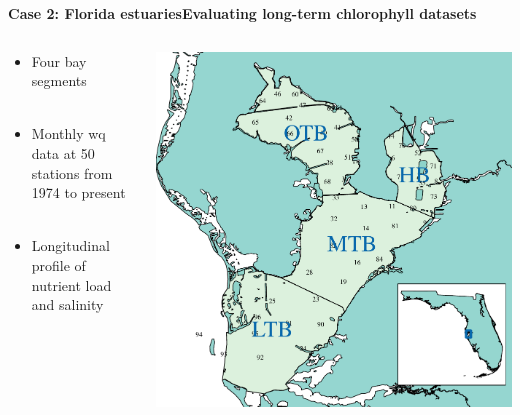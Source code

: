 \documentclass[serif]{beamer}\usepackage[]{graphicx}\usepackage[]{color}
\begin{document}
\begin{frame}{\textbf{Case 2: Florida estuaries}}{\textbf{Evaluating long-term chlorophyll datasets}}
\begin{columns}
\begin{column}{0.5\textwidth}
\begin{itemize}
\item Four bay segments\\~\\
\item Monthly wq data at 50 stations from 1974 to present \\~\\
\item Longitudinal profile of nutrient load and salinity \\~\\
\end{itemize}
\vspace{0cm}\hspace*{15pt}
\end{column}
\begin{column}{0.5\textwidth}
\centerline{\includegraphics[width = \textwidth]{fig/tb_map.pdf}}
\end{column}
\end{columns}
\end{frame}
\end{document}
